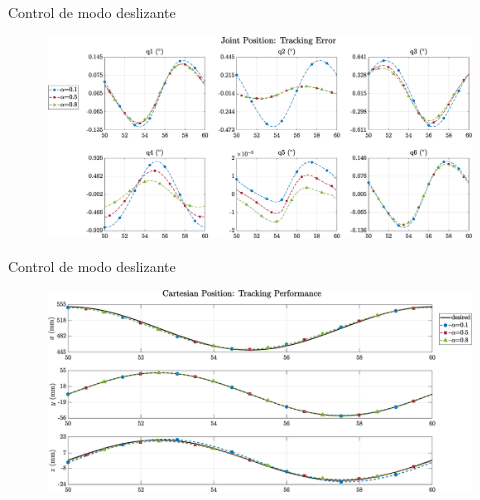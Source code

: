 \documentclass[10pt]{beamer} %
\begin{document}
	\begin{frame}[fragile]{Control de modo deslizante}
		\begin{figure}
			\centering
			\hspace*{-0.7cm}\includegraphics[width=1.1\textwidth]{img/SMCi/circular_traj/60_seg/articular_SMCi_position_error_compare.eps}
		\end{figure}
	\end{frame}	
	


	\begin{frame}[fragile]{Control de modo deslizante}
		\begin{figure}
			\centering
			\hspace*{-0.5cm}\includegraphics[width=1.1\textwidth]{img/SMCi/circular_traj/60_seg/articular_SMCi_pos_xyz_compare.eps}
		\end{figure}
	\end{frame}
\end{document}
